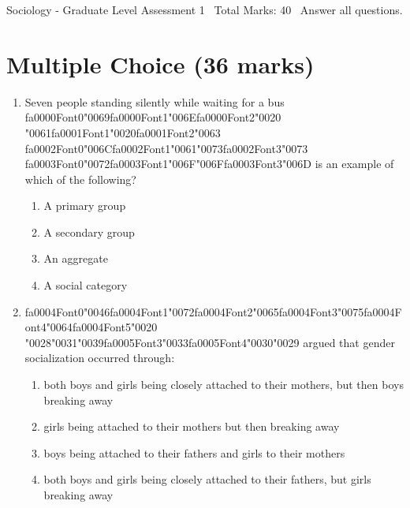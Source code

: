 \documentclass[12pt]{article}
\begin{document}
\begin{center}
Sociology - Graduate Level Assessment 1 \
Total Marks: 40 \
Answer all questions.
\end{center}

\section*{Multiple Choice (36 marks)}
\begin{enumerate}[label=\arabic*.]
\item Seven people standing silently while waiting for a bus {\csname fa0000Font0\endcsname\char"0069}{\csname fa0000Font1\endcsname\char"006E}{\csname fa0000Font2\endcsname\char"0020} {\char"0061}{\csname fa0001Font1\endcsname\char"0020}{\csname fa0001Font2\endcsname\char"0063} {\csname fa0002Font0\endcsname\char"006C}{\csname fa0002Font1\endcsname\char"0061}{\char"0073}{\csname fa0002Font3\endcsname\char"0073} {\csname fa0003Font0\endcsname\char"0072}{\csname fa0003Font1\endcsname\char"006F}{\char"006F}{\csname fa0003Font3\endcsname\char"006D} is an example of which of the following?
\begin{enumerate}[label=(\alph*)]
    \item A primary group
    \item A secondary group
    \item An aggregate
    \item A social category
\end{enumerate}
\item {\csname fa0004Font0\endcsname\char"0046}{\csname fa0004Font1\endcsname\char"0072}{\csname fa0004Font2\endcsname\char"0065}{\csname fa0004Font3\endcsname\char"0075}{\csname fa0004Font4\endcsname\char"0064}{\csname fa0004Font5\endcsname\char"0020} {\char"0028}{\char"0031}{\char"0039}{\csname fa0005Font3\endcsname\char"0033}{\csname fa0005Font4\endcsname\char"0030}{\char"0029} argued that gender socialization occurred through:
\begin{enumerate}[label=(\alph*)]
    \item both boys and girls being closely attached to their mothers, but then boys breaking away
    \item girls being attached to their mothers but then breaking away
    \item boys being attached to their fathers and girls to their mothers
    \item both boys and girls being closely attached to their fathers, but girls breaking away
\end{enumerate}

\end{enumerate}
\end{document}
